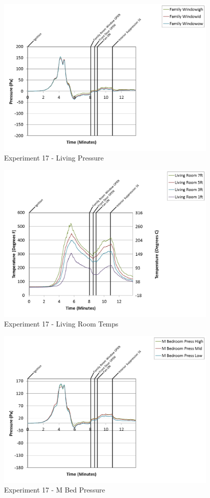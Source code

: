 \documentclass{article}
\begin{document}
\begin{appendices}
\begin{figure}[h!]
	\centering
	\includegraphics[height=3.05in]{0_Images/Results_Charts/Exp_17_Charts/LivingPressure.png}
	\caption{Experiment 17 - Living Pressure}
\end{figure}

\clearpage

\begin{figure}[h!]
	\centering
	\includegraphics[height=3.05in]{0_Images/Results_Charts/Exp_17_Charts/LivingRoomTemps.png}
	\caption{Experiment 17 - Living Room Temps}
\end{figure}


\begin{figure}[h!]
	\centering
	\includegraphics[height=3.05in]{0_Images/Results_Charts/Exp_17_Charts/MBedPressure.png}
	\caption{Experiment 17 - M Bed Pressure}
\end{figure}


\end{appendices}
\end{document}
